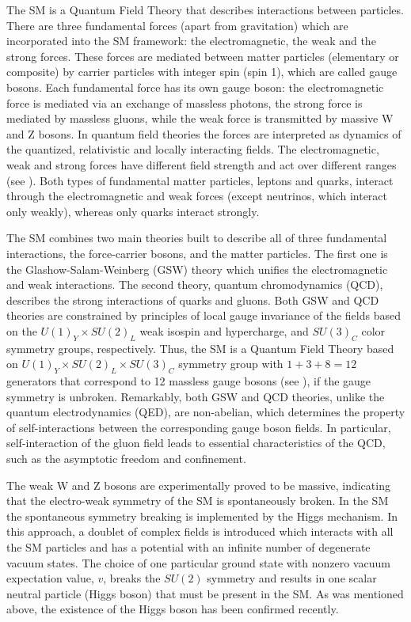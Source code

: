 The SM is a Quantum Field Theory that describes interactions between particles.
There are three fundamental forces (apart from gravitation) which are incorporated into the SM framework: the electromagnetic, the weak and the strong forces. These forces are mediated between matter particles (elementary or composite) by carrier particles with integer spin (spin 1), which are called gauge bosons.
Each fundamental force has its own gauge boson: the electromagnetic force is mediated via an exchange of massless photons, the strong force is mediated by massless gluons, while the weak force is transmitted by massive W and Z bosons.
In quantum field theories the forces are interpreted as dynamics of the quantized, relativistic and locally interacting fields.
The electromagnetic, weak and strong forces have different field strength and act over different ranges (see ). 
Both types of fundamental matter particles, leptons and quarks, interact through the electromagnetic and weak forces (except neutrinos, which interact only weakly), whereas only quarks interact strongly.

The SM combines two main theories built to describe all of three fundamental interactions, the force-carrier bosons, and the matter particles. The first one is the Glashow-Salam-Weinberg (GSW) theory which unifies the electromagnetic and weak interactions. The second theory, quantum chromodynamics (QCD), describes the strong interactions of quarks and gluons. Both GSW and QCD theories are constrained by principles of local gauge invariance of the fields based on the $U(1)_Y\times SU(2)_{L}$ weak isospin and hypercharge, and $SU(3)_C$ color symmetry groups, respectively. Thus, the SM is a Quantum Field Theory based on $U(1)_Y\times SU(2)_{L}\times SU(3)_C$ symmetry group with $1+3+8=12$ generators that correspond to 12 massless gauge bosons (see ), if the gauge symmetry is unbroken. 
Remarkably, both GSW and QCD theories, unlike the quantum electrodynamics (QED), are non-abelian, which determines the property of self-interactions between the corresponding gauge boson fields. In particular, self-interaction of the gluon field leads to essential characteristics of the QCD, such as the asymptotic freedom and confinement.

The weak W and Z bosons are experimentally proved to be massive, indicating that the electro-weak symmetry of the SM is spontaneously broken. 
In the SM the spontaneous symmetry breaking is implemented by the Higgs mechanism. In this approach,
a doublet of complex fields is introduced which interacts with all the SM particles and has a potential with an infinite number of degenerate vacuum states. 
The choice of one particular ground state with nonzero vacuum expectation value, $v$, breaks the $SU(2)$ symmetry and results in one scalar neutral particle (Higgs boson) that must be present in the SM. As was mentioned above, the existence of the Higgs boson has been confirmed recently.

